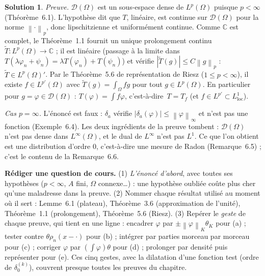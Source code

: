 \documentclass[11pt,a4paper]{article}
\newcommand{\C}{\mathbb{C}}
\newcommand{\norm}[1]{\left\|#1\right\|}
\newcommand{\ie}{c'est-à-dire}
\newcommand{\D}{\mathcal{D}}
\theoremstyle{definition}
\newtheorem*{solution}{Solution}
\begin{document}
\begin{solution}
\emph{Preuve.} $\D(\Omega)$ est un sous-espace dense de $L^p(\Omega)$ puisque $p<\infty$ (Théorème~6.1). L'hypothèse dit que $T$, linéaire, est continue sur $\D(\Omega)$ pour la norme $\norm\cdot_p$, donc lipschitzienne et uniformément continue. Comme $\C$ est complet, le Théorème~1.1 fournit un unique prolongement continu $\tilde T:L^p(\Omega)\to\C$ ; il est linéaire (passage à la limite dans $T(\lambda\varphi_n+\psi_n)=\lambda T(\varphi_n)+T(\psi_n)$) et vérifie $|\tilde T(g)|\le C\norm g_p$ : $\tilde T\in L^p(\Omega)'$. Par le Théorème~5.6 de représentation de Riesz ($1\le p<\infty$), il existe $f\in L^{p'}(\Omega)$ avec $\tilde T(g)=\int_\Omega fg$ pour tout $g\in L^p(\Omega)$. En particulier pour $g=\varphi\in\D(\Omega)$ : $T(\varphi)=\int f\varphi$, \ie\ $T=T_f$ (et $f\in L^{p'}\subset L^1_{\mathrm{loc}}$).

\emph{Cas $p=\infty$.} L'énoncé est faux : $\delta_a$ vérifie $|\delta_a(\varphi)|\le\norm\varphi_\infty$ et n'est pas une fonction (Exemple~6.4). Les deux ingrédients de la preuve tombent : $\D(\Omega)$ n'est pas dense dans $L^\infty(\Omega)$, et le dual de $L^\infty$ n'est pas $L^1$. Ce que l'on obtient est une distribution d'ordre $0$, c'est-à-dire une mesure de Radon (Remarque~6.5) ; c'est le contenu de la Remarque~6.6.
\end{solution}

\begin{methode}
\textbf{Rédiger une question de cours.} (1) \emph{L'énoncé d'abord}, avec toutes ses hypothèses ($p<\infty$, $A$ fini, $\Omega$ connexe…) : une hypothèse oubliée coûte plus cher qu'une maladresse dans la preuve. (2) Nommer chaque résultat utilisé au moment où il sert : Lemme~6.1 (plateau), Théorème~3.6 (approximation de l'unité), Théorème~1.1 (prolongement), Théorème~5.6 (Riesz). (3) Repérer le \emph{geste} de chaque preuve, qui tient en une ligne : encadrer $\varphi$ par $\pm\norm\varphi_K\theta_K$ pour (a) ; tester contre $\theta\rho_n(x-\cdot)$ pour (b) ; intégrer par parties morceau par morceau pour (c) ; corriger $\varphi$ par $(\int\varphi)\theta$ pour (d) ; prolonger par densité puis représenter pour (e). Ces cinq gestes, avec la dilatation d'une fonction test (ordre de $\delta_0^{(k)}$), couvrent presque toutes les preuves du chapitre.
\end{methode}
\end{document}
